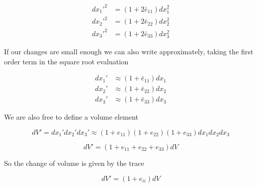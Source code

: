 \begin{align}\label{eqn:continuumL2:270}
{dx_1'}^2 &= (1 + 2 \bar{e}_{11}) dx_1^2 \\
{dx_2'}^2 &= (1 + 2 \bar{e}_{22}) dx_2^2 \\
{dx_3'}^2 &= (1 + 2 \bar{e}_{33}) dx_3^2
\end{align}

If our changes are small enough we can also write approximately, taking the first order term in the square root evaluation

\begin{align}\label{eqn:continuumL2:290}
dx_1' &\approx (1 + \bar{e}_{11}) dx_1 \\
dx_2' &\approx (1 + \bar{e}_{22}) dx_2 \\
dx_3' &\approx (1 + \bar{e}_{33}) dx_3
\end{align}

We are also free to define a volume element

\begin{equation}\label{eqn:continuumL2:310}
dV' =
dx_1'
dx_2'
dx_3'
\approx
(1 + e_{11})
(1 + e_{22})
(1 + e_{33})
dx_1 dx_2 dx_3
\end{equation}

\begin{equation}\label{eqn:continuumL2:330}
dV' = (1 + e_{11} +e_{22} +e_{33} ) dV
\end{equation}

So the change of volume is given by the trace

\begin{equation}\label{eqn:continuumL2:350}
dV' = ( 1 + e_{ii} ) dV
\end{equation}
